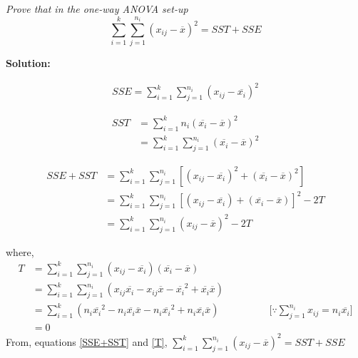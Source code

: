 \documentclass[12pt,letterpaper, fleqn]{article}
\begin{document}
\textit{Prove that in the one-way ANOVA set-up}
$$\sum_{i = 1}^k \sum_{j = 1}^{n_i} (x_{ij} - \overline{x})^2 = SST + SSE$$

\vspace{1em}

\textbf{Solution:}

\begin{equation}
  \begin{split}
    SSE = \sum_{i = 1}^k \sum_{j = 1}^{n_i} (x_{ij} - \overline{x_i})^2
  \end{split}
\end{equation}

\begin{equation}
  \begin{split}
    SST &= \sum_{i = 1}^k n_i (\overline{x_i} - \overline{x})^2\\
    &= \sum_{i = 1}^k \sum_{j = 1}^{n_i} (\overline{x_i} - \overline{x})^2
  \end{split}
\end{equation}

\begin{equation}
  \begin{split}
    SSE + SST &= \sum_{i = 1}^k \sum_{j = 1}^{n_i} [(x_{ij} - \overline{x_i})^2 + (\overline{x_i} - \overline{x})^2]\\
    &= \sum_{i = 1}^k \sum_{j = 1}^{n_i} [(x_{ij} - \overline{x_i}) + (\overline{x_i} - \overline{x})]^2 - 2T\\
    &= \sum_{i = 1}^k \sum_{j = 1}^{n_i} (x_{ij} - \overline{x})^2 - 2T
  \end{split}
  \label{SSE+SST}
\end{equation}

where,
\begin{equation}
  \begin{split}
    T &= \sum_{i = 1}^k \sum_{j = 1}^{n_i} (x_{ij} - \overline{x_i})(\overline{x_i} - \overline{x})\\
    &= \sum_{i = 1}^k \sum_{j = 1}^{n_i} (x_{ij}\overline{x_i} - x_{ij}\overline{x} - \overline{x_i}^2 + \overline{x_i}\overline{x})\\
    &= \sum_{i = 1}^k (n_i\overline{x_i}^2 - n_i\overline{x_i}\overline{x} - n_i\overline{x_i}^2 + n_i\overline{x_i}\overline{x}) \hspace{5em} \Biggl[\because \sum_{j = 1}^{n_i} x_{ij} = n_i\overline{x_i}\Biggr]\\
    &= 0
  \end{split}
  \label{T}
\end{equation}
From, equations \ref{SSE+SST} and \ref{T}, $\sum_{i = 1}^k \sum_{j = 1}^{n_i} (x_{ij} - \overline{x})^2 = SST + SSE$
\end{document}
